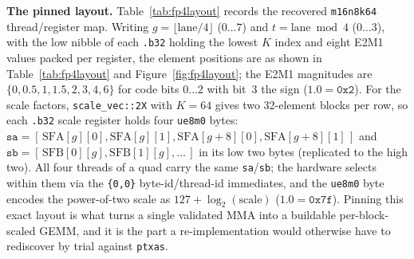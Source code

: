 \documentclass[11pt]{article}
\begin{document}
\textbf{The pinned layout.} Table~\ref{tab:fp4layout} records the recovered \texttt{m16n8k64} thread/register map. Writing $g=\lfloor\text{lane}/4\rfloor$ ($0\ldots7$) and $t=\text{lane}\bmod 4$ ($0\ldots3$), with the low nibble of each \texttt{.b32} holding the lowest $K$ index and eight E2M1 values packed per register, the element positions are as shown in Table~\ref{tab:fp4layout} and Figure~\ref{fig:fp4layout}; the E2M1 magnitudes are $\{0,0.5,1,1.5,2,3,4,6\}$ for code bits $0\ldots2$ with bit~3 the sign ($1.0=\texttt{0x2}$). For the scale factors, \texttt{scale\_vec::2X} with $K=64$ gives two 32-element blocks per row, so each \texttt{.b32} scale register holds four \texttt{ue8m0} bytes: $\texttt{sa}=[\,\text{SFA}[g][0],\text{SFA}[g][1],\text{SFA}[g{+}8][0],\text{SFA}[g{+}8][1]\,]$ and $\texttt{sb}=[\,\text{SFB}[0][g],\text{SFB}[1][g],\ldots\,]$ in its low two bytes (replicated to the high two). All four threads of a quad carry the same \texttt{sa}/\texttt{sb}; the hardware selects within them via the \texttt{\{0,0\}} byte-id/thread-id immediates, and the \texttt{ue8m0} byte encodes the power-of-two scale as $127+\log_2(\text{scale})$ ($1.0=\texttt{0x7f}$). Pinning this exact layout is what turns a single validated MMA into a buildable per-block-scaled GEMM, and it is the part a re-implementation would otherwise have to rediscover by trial against \texttt{ptxas}.
\end{document}
